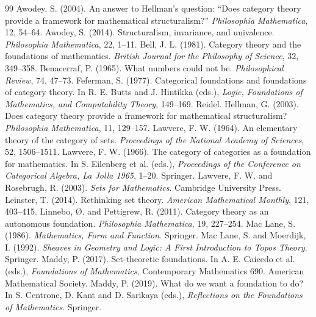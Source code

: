 \documentclass{situationist-preprint}
\begin{document}
\begin{thebibliography}{99}\small
{} Awodey, S. (2004). An answer to Hellman's question: \enquote{Does category theory provide a framework for mathematical structuralism?} \emph{Philosophia Mathematica}, 12, 54--64.
 Awodey, S. (2014). Structuralism, invariance, and univalence. \emph{Philosophia Mathematica}, 22, 1--11.
 Bell, J. L. (1981). Category theory and the foundations of mathematics. \emph{British Journal for the Philosophy of Science}, 32, 349--358.
 Benacerraf, P. (1965). What numbers could not be. \emph{Philosophical Review}, 74, 47--73.
 Feferman, S. (1977). Categorical foundations and foundations of category theory. In R. E. Butts and J. Hintikka (eds.), \emph{Logic, Foundations of Mathematics, and Computability Theory}, 149--169. Reidel.
 Hellman, G. (2003). Does category theory provide a framework for mathematical structuralism? \emph{Philosophia Mathematica}, 11, 129--157.
 Lawvere, F. W. (1964). An elementary theory of the category of sets. \emph{Proceedings of the National Academy of Sciences}, 52, 1506--1511.
 Lawvere, F. W. (1966). The category of categories as a foundation for mathematics. In S. Eilenberg et al. (eds.), \emph{Proceedings of the Conference on Categorical Algebra, La Jolla 1965}, 1--20. Springer.
 Lawvere, F. W. and Rosebrugh, R. (2003). \emph{Sets for Mathematics}. Cambridge University Press.
 Leinster, T. (2014). Rethinking set theory. \emph{American Mathematical Monthly}, 121, 403--415.
 Linnebo, Ø. and Pettigrew, R. (2011). Category theory as an autonomous foundation. \emph{Philosophia Mathematica}, 19, 227--254.
 Mac Lane, S. (1986). \emph{Mathematics, Form and Function}. Springer.
 Mac Lane, S. and Moerdijk, I. (1992). \emph{Sheaves in Geometry and Logic: A First Introduction to Topos Theory}. Springer.
 Maddy, P. (2017). Set-theoretic foundations. In A. E. Caicedo et al. (eds.), \emph{Foundations of Mathematics}, Contemporary Mathematics 690. American Mathematical Society.
 Maddy, P. (2019). What do we want a foundation to do? In S. Centrone, D. Kant and D. Sarikaya (eds.), \emph{Reflections on the Foundations of Mathematics}. Springer.

\end{thebibliography}
\end{document}
